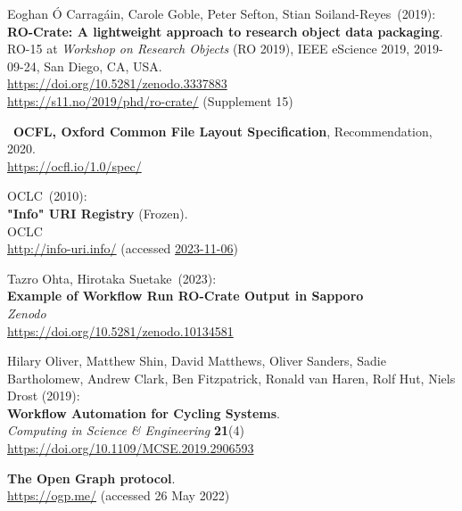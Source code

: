 \begin{thebibliography}{9}
Eoghan Ó Carragáin, Carole Goble, Peter Sefton, Stian Soiland-Reyes~(2019): \\
\textbf{RO-Crate: A lightweight approach to research object data packaging}.\\
RO-15 at \emph{Workshop on Research Objects} (RO 2019), IEEE eScience 2019, 2019-09-24, San Diego, CA, USA.\\
\url{https://doi.org/10.5281/zenodo.3337883}\\
\url{https://s11.no/2019/phd/ro-crate/}
(Supplement 15)

~\textbf{OCFL, Oxford Common File Layout Specification}, Recommendation, 2020.\\
\url{https://ocfl.io/1.0/spec/}

OCLC~(2010): \\
\textbf{"Info" {URI Registry}} ({Frozen}). \\
OCLC\\
\url{http://info-uri.info/} 
(accessed \href{https://web.archive.org/web/20231106015204/https://oclc-research.github.io/infoURI-Frozen/}{2023-11-06})

Tazro Ohta, Hirotaka Suetake~(2023): \\
\textbf{Example of Workflow Run RO-Crate Output in Sapporo}\\
\emph{Zenodo}\\
\url{https://doi.org/10.5281/zenodo.10134581}

Hilary Oliver, Matthew Shin, David Matthews, Oliver Sanders, Sadie Bartholomew, Andrew Clark, Ben Fitzpatrick, Ronald van Haren, Rolf Hut, Niels Drost (2019):\\
\textbf{Workflow Automation for Cycling Systems}.\\
\emph{Computing in Science \& Engineering} \textbf{21}(4) \\
\url{https://doi.org/10.1109/MCSE.2019.2906593}


\textbf{The {Open Graph} protocol}.  \\
\url{https://ogp.me/}
(accessed 26 May 2022)


\end{thebibliography}
